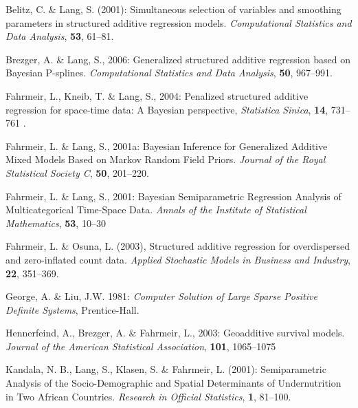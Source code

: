 \documentclass[11pt,a4paper,twoside]{bayesxreport}
\begin{document}




\begin{thebibliography}{99}

 Belitz, C. \& Lang, S.  (2001): Simultaneous selection of variables and smoothing
parameters in structured additive regression models. {\it Computational Statistics and Data Analysis}, {\bf 53}, 61--81.

 Brezger, A. \& Lang, S., 2006: Generalized structured additive regression based
on Bayesian P-splines. {\it Computational Statistics and Data Analysis}, {\bf 50}, 967--991.

 Fahrmeir, L., Kneib, T. \& Lang, S., 2004: Penalized structured additive
regression for space-time data: A Bayesian perspective, {\it Statistica Sinica}, {\bf 14}, 731--761 .

 Fahrmeir, L. \& Lang, S., 2001a: Bayesian Inference for Generalized Additive
Mixed Models Based on Markov Random Field Priors. {\it Journal of the Royal Statistical Society C}, {\bf 50}, 201--220.

 Fahrmeir, L. \& Lang, S., 2001: Bayesian Semiparametric Regression Analysis of
Multicategorical Time-Space Data. {\it Annals of the Institute of Statistical Mathematics}, {\bf 53}, 10--30

 Fahrmeir, L. \& Osuna, L. (2003), Structured additive regression for
overdispersed and zero-inflated count data. {\it Applied Stochastic Models in Business and Industry}, {\bf 22}, 351--369.

 George, A. \& Liu, J.W. 1981: {\it Computer Solution of Large Sparse Positive
Definite Systems}, Prentice-Hall.

 Hennerfeind, A., Brezger, A. \& Fahrmeir, L., 2003: Geoadditive
survival models. {\it Journal of the American Statistical Association}, {\bf 101}, 1065--1075

 Kandala, N. B., Lang, S., Klasen, S. \& Fahrmeir, L. (2001): Semiparametric
Analysis of the Socio-Demographic and Spatial Determinants of Undernutrition in Two African Countries. {\it Research in
Official Statistics}, {\bf 1}, 81--100.


\end{thebibliography}
\end{document}
